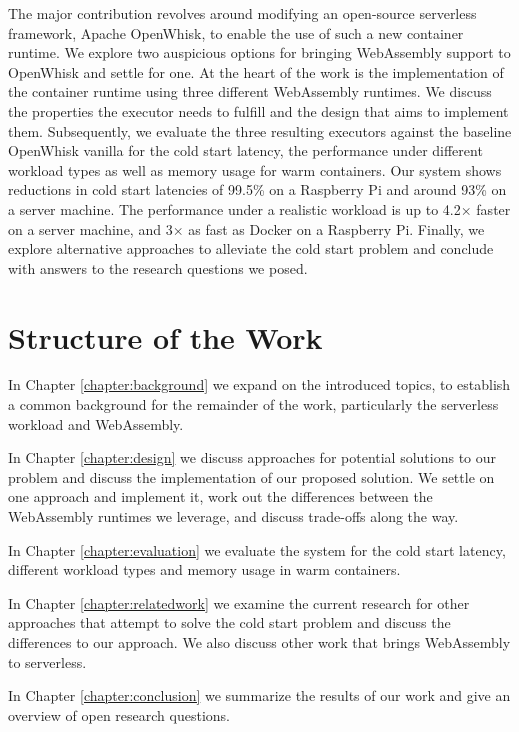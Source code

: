 The major contribution revolves around modifying an open-source serverless framework, Apache OpenWhisk, to enable the use of such a new container runtime. We explore two auspicious options for bringing WebAssembly support to OpenWhisk and settle for one. At the heart of the work is the implementation of the container runtime using three different WebAssembly runtimes. We discuss the properties the executor needs to fulfill and the design that aims to implement them. Subsequently, we evaluate the three resulting executors against the baseline OpenWhisk vanilla for the cold start latency, the performance under different workload types as well as memory usage for warm containers.
Our system shows reductions in cold start latencies of 99.5\% on a Raspberry Pi and around 93\% on a server machine. The performance under a realistic workload is up to 4.2$\times$ faster on a server machine, and 3$\times$ as fast as Docker on a Raspberry Pi.
Finally, we explore alternative approaches to alleviate the cold start problem and conclude with answers to the research questions we posed.


\section{Structure of the Work}

In Chapter \ref{chapter:background} we expand on the introduced topics, to establish a common background for the remainder of the work, particularly the serverless workload and WebAssembly.

In Chapter \ref{chapter:design} we discuss approaches for potential solutions to our problem and discuss the implementation of our proposed solution. We settle on one approach and implement it, work out the differences between the WebAssembly runtimes we leverage, and discuss trade-offs along the way.

In Chapter \ref{chapter:evaluation} we evaluate the system for the cold start latency, different workload types and memory usage in warm containers.

In Chapter \ref{chapter:relatedwork} we examine the current research for other approaches that attempt to solve the cold start problem and discuss the differences to our approach. We also discuss other work that brings WebAssembly to serverless.

In Chapter \ref{chapter:conclusion} we summarize the results of our work and give an overview of open research questions.